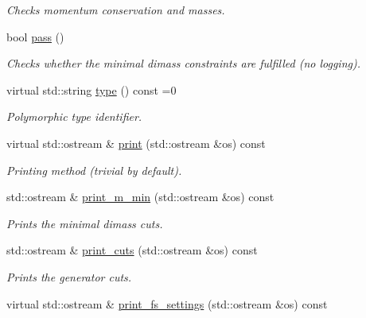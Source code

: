 \begin{DoxyCompactItemize}
\begin{DoxyCompactList}\small\item\em Checks momentum conservation and masses. \end{DoxyCompactList}\item 
bool \hyperlink{a00450_a24a50f42820c055aae4511f14e032b93}{pass} ()
\begin{DoxyCompactList}\small\item\em Checks whether the minimal dimass constraints are fulfilled (no logging). \end{DoxyCompactList}\item 
\hypertarget{a00450_a4f41294f49ce983a674749cf92f23b7c}{}virtual std\+::string \hyperlink{a00450_a4f41294f49ce983a674749cf92f23b7c}{type} () const =0\label{a00450_a4f41294f49ce983a674749cf92f23b7c}

\begin{DoxyCompactList}\small\item\em Polymorphic type identifier. \end{DoxyCompactList}\item 
\hypertarget{a00450_a3de071389117363181d3aeb95c620c40}{}virtual std\+::ostream \& \hyperlink{a00450_a3de071389117363181d3aeb95c620c40}{print} (std\+::ostream \&os) const \label{a00450_a3de071389117363181d3aeb95c620c40}

\begin{DoxyCompactList}\small\item\em Printing method (trivial by default). \end{DoxyCompactList}\item 
\hypertarget{a00450_ad5f3de673fb4b1e15fa5ce22e45a49e2}{}std\+::ostream \& \hyperlink{a00450_ad5f3de673fb4b1e15fa5ce22e45a49e2}{print\+\_\+m\+\_\+min} (std\+::ostream \&os) const \label{a00450_ad5f3de673fb4b1e15fa5ce22e45a49e2}

\begin{DoxyCompactList}\small\item\em Prints the minimal dimass cuts. \end{DoxyCompactList}\item 
\hypertarget{a00450_acb959afdb2677f3d8e14c122cf82cc8e}{}std\+::ostream \& \hyperlink{a00450_acb959afdb2677f3d8e14c122cf82cc8e}{print\+\_\+cuts} (std\+::ostream \&os) const \label{a00450_acb959afdb2677f3d8e14c122cf82cc8e}

\begin{DoxyCompactList}\small\item\em Prints the generator cuts. \end{DoxyCompactList}\item 
\hypertarget{a00450_ad624214090c7af05dea86e49898e416f}{}virtual std\+::ostream \& \hyperlink{a00450_ad624214090c7af05dea86e49898e416f}{print\+\_\+fs\+\_\+settings} (std\+::ostream \&os) const \label{a00450_ad624214090c7af05dea86e49898e416f}


\end{DoxyCompactItemize}
